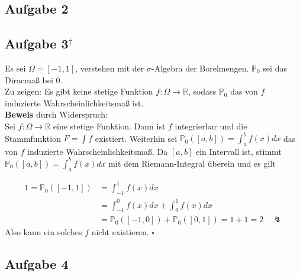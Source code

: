 \documentclass[11pt,a4paper,ngerman]{article}
\newcommand{\Prob}{\mathbb{P}}
\newcommand{\alex}{$^\dagger$}
\begin{document}
\subsection*{Aufgabe 2}


\subsection*{Aufgabe 3\alex}
Es sei $\Omega = [-1,1]$, verstehen mit der $\sigma$-Algebra der Borelmengen.
$\Prob_0$ sei das Diracmaß bei 0.\\
Zu zeigen: Es gibt keine stetige Funktion $f: \Omega \to  \mathbb{R}$,
sodass $\Prob_0$ das von $f$ induzierte Wahrscheinlichkeitsmaß ist. \\

\textbf{Beweis} durch Widerspruch: \\
Sei $f: \Omega \to \mathbb{R}$ eine stetige Funktion. Dann ist $f$ integrierbar und
die Stammfunktion $F = \int f$ existiert. Weiterhin sei $\Prob_0([a,b]) = \int_a^b f(x) dx$
das von $f$ induzierte Wahrscheinlichkeitsmaß. Da $[a,b]$ ein Intervall ist,
stimmt $\Prob_0([a,b]) = \int_a^b f(x) dx$ mit dem Riemann-Integral überein und es gilt

\begin{equation*}\begin{split}
1 = \Prob_0([-1,1]) &= \int_{-1}^1 f(x) dx \\
  &=  \int_{-1}^0 f(x) dx +  \int_{0}^1 f(x) dx \\
  &= \Prob_0([-1,0]) +  \Prob_0([0,1]) = 1 + 1 = 2 \quad \lightning
\end{split}\end{equation*}
Also kann ein solches $f$ nicht existieren.
\mbox{} \hfill $\square$

\subsection*{Aufgabe 4}



\label{LastPage}
\end{document}
